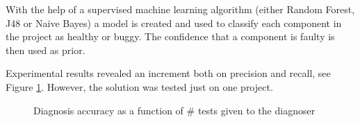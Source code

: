 With the help of a supervised machine learning algorithm (either Random Forest, J48 or Naive Bayes) a model is created and used to classify each component in the project as healthy or buggy. The confidence that a component is faulty is then used as prior.

Experimental results revealed an increment both on precision and recall, see Figure \ref{fig:elmishali}. However, the solution was tested just on one project.
%
\begin{figure}%
    \centering
    \qquad
    \caption{Diagnosis accuracy as a function of \# tests given to the diagnoser}%
    \label{fig:elmishali}%
\end{figure}
